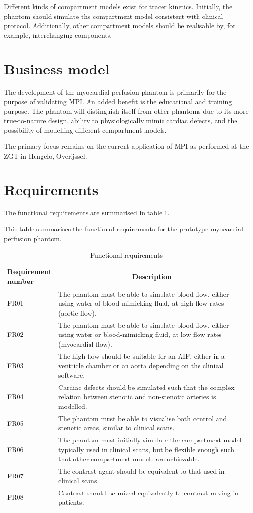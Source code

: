 Different kinds of compartment models exist for tracer kinetics. Initially, the phantom should simulate the compartment model consistent with clinical protocol. Additionally, other compartment models should be realisable by, for example, interchanging components.

\section{Business model}
The development of the myocardial perfusion phantom is primarily for the purpose of validating \ac{MPI}. An added benefit is the educational and training purpose. The phantom will distinguish itself from other phantoms due to its more true-to-nature design, ability to physiologically mimic cardiac defects, and the possibility of modelling different compartment models.

The primary focus remains on the current application of \ac{MPI} as performed at the ZGT in Hengelo, Overijssel.

\section{Requirements}
The functional requirements are summarised in table \ref{tab:funcreq}.

\begin{table}[H]
\caption{Functional requirements}
\label{tab:funcreq}
This table summarises the functional requirements for the prototype myocardial perfusion phantom.
\begin{tabular}{l|p{120mm}|}
	\makecell[l]{Requirement \\ number} & \multicolumn{1}{c}{Description}\\
	\hline
	FR01 & The phantom must be able to simulate blood flow, either using water of blood-mimicking fluid, at high flow rates (aortic flow). \\ 
	\rowcolor{Gray}
	FR02 & The phantom must be able to simulate blood flow, either using water or blood-mimicking fluid, at low flow rates (myocardial flow). \\
	FR03 & The high flow should be suitable for an \ac{AIF}, either in a ventricle chamber or an aorta depending on the clinical software. \\
	\rowcolor{Gray}
	FR04 & Cardiac defects should be simulated such that the complex relation between stenotic and non-stenotic arteries is modelled. \\
	FR05 & The phantom must be able to visualise both control and stenotic areas, similar to clinical scans. \\
	\rowcolor{Gray}
	FR06 & The phantom must initially simulate the compartment model typically used in clinical scans, but be flexible enough such that other compartment models are achievable. \\
	FR07 & The contrast agent should be equivalent to that used in clinical scans. \\
	\rowcolor{Gray}
	FR08 & Contrast should be mixed equivalently to contrast mixing in patients. \\
	\cline{2-2}
\end{tabular}
\end{table}

